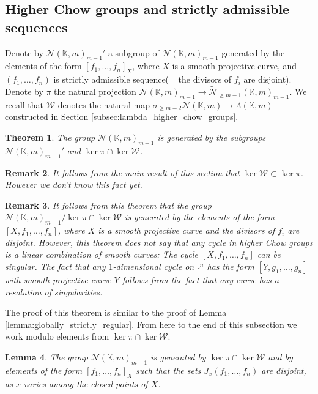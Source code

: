\documentclass[12pt]{extarticle}
\newtheorem{theorem}{Theorem}[section]
\newtheorem{lemma}[theorem]{Lemma}
\newtheorem{remark}[theorem]{Remark}
\def\mb{\mathbb}
\def\mc{\mathcal}
\def\L{\Lambda}
\def\k{\mb K}
\def\N{\mc N}
\def\wt{\widetilde}
\def\W{\mc W}
\def \CH{\mc{N}}
\def \wCH{\wt{\CH}_{\geq m-1}}
\begin{document}
\subsection{Higher Chow groups and strictly admissible sequences}

Denote by $\CH(\k,m)_{m-1}'$ a subgroup of $\CH(\k,m)_{m-1}$ generated by the elements of the form $[f_1,\dots, f_n]_X$, where $X$ is a smooth projective curve, and $(f_1,\dots, f_n)$ is strictly admissible sequence(= the divisors of $f_i$ are disjoint). Denote by $\pi$ the natural projection $\CH(\k,m)_{m-1}\to\wCH(\k,m)_{m-1}.$ We recall that $\mc W$ denotes the natural map $\sigma_{\geq m-2}\N(\k,m)\to \L(\k,m)$ constructed in Section \ref{subsec:lambda_higher_chow_groups}.

\begin{theorem}
\label{th:Chow_genereted_disjoint_divisors}
    The group $\CH(\k,m)_{m-1}$ is generated by the subgroups $\CH(\k,m)_{m-1}'$ and $\ker\pi\cap\ker\W$.
\end{theorem}

\begin{remark}
    It follows from the main result of this section that $\ker \W\subset \ker \pi$. However we don't know this fact yet.
\end{remark}

\begin{remark}
    It follows from this theorem that the group $\CH(\k,m)_{m-1}/\ker\pi\cap\ker\W$ is generated by the elements of the form $[X,f_1,\dots, f_n]$, where $X$ is a smooth projective curve and the divisors of $f_i$ are disjoint. However, this theorem does not say that any cycle in higher Chow groups is a linear combination of smooth curves; The cycle $[X,f_1,\dots, f_n]$ can be singular. The fact that any $1$-dimensional cycle on $\square^n$ has the form $[Y,g_1,\dots, g_n]$ with smooth projective curve $Y$ follows from the fact that any curve has a resolution of singularities.
\end{remark}



The proof of this theorem is similar to the proof of Lemma \ref{lemma:globally_strictly_regular}. From here to the end of this subsection we work modulo elements from $\ker\pi\cap\ker\W$. 


\begin{lemma}
    The group $\CH(\k,m)_{m-1}$ is generated by $\ker\pi\cap\ker\W$ and by elements of the form $[f_1,\dots, f_n]_X$ such that the sets $J_x(f_1,\dots, f_n)$ are disjoint, as $x$ varies among the closed points of $X$.
\end{lemma}
\end{document}
